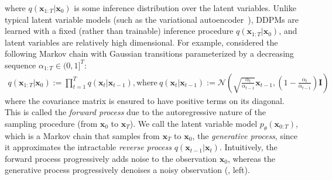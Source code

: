 where $q(\bm{x}_{1:T} | \bm{x}_0)$ is some inference distribution over the latent variables.
Unlike typical latent variable models (such as the variational autoencoder~\citep{rezende2014stochastic}), DDPMs are learned with a fixed (rather than trainable) inference procedure $q(\bm{x}_{1:T} | \bm{x}_0)$, 
and latent variables are relatively high dimensional. 
For example, \citet{ho2020denoising} considered the following Markov chain with Gaussian transitions 
parameterized by a decreasing sequence
$\alpha_{1:T} \in (0, 1]^T$:
\begin{align}
    q(\bm{x}_{1:T} | \bm{x}_0) := \prod_{t=1}^{T} q(\bm{x}_t | \bm{x}_{t-1}), \text{where} \ q(\bm{x}_t | \bm{x}_{t-1}) := \mathcal{N}\left(\sqrt{\frac{\alpha_t}{\alpha_{t-1}}} \bm{x}_{t-1}, \left(1 - \frac{\alpha_t}{\alpha_{t-1}}\right) \bm{I}\right) \label{eq:diff-ho}
\end{align}
where the covariance matrix is ensured to have positive terms on its diagonal.
This is called the \textit{forward process} due to the autoregressive nature of the sampling procedure (from $\bm{x}_0$ to $\bm{x}_T$). We call the latent variable model $p_\theta(\bm{x}_{0:T})$, which is a Markov chain that samples from $\bm{x}_T$ to $\bm{x}_0$, the \textit{generative process}, since it approximates the intractable \textit{reverse process} $q(\bm{x}_{t-1} | \bm{x}_t)$. Intuitively, the forward process progressively adds noise to the observation $\bm{x}_0$, whereas the generative process progressively denoises a noisy observation (, left).

